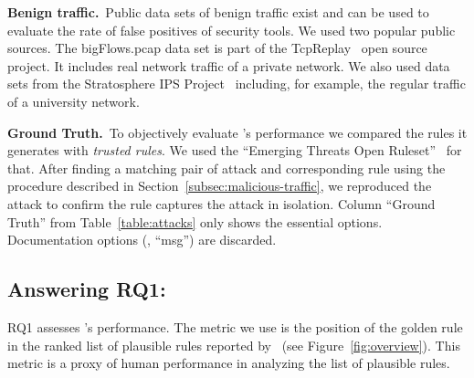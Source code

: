 \documentclass[conference]{IEEEtran}
\begin{document}
\noindent\textbf{Benign traffic.}~Public data sets of benign traffic
exist and can be used to evaluate the rate of false positives of
security tools. We used two popular public sources. The bigFlows.pcap
data set is part of the TcpReplay~\cite{tcpreplay} open source
project. It includes real network traffic of a private network. We
also used data sets from the Stratosphere IPS
Project~\cite{stratosphere-normal} including, for example, the regular
traffic of a university network.

\noindent\textbf{Ground Truth.}~To objectively evaluate \tname{}'s
performance we compared the rules it generates with \emph{trusted
  rules}. We used the ``Emerging Threats Open
Ruleset''~\cite{emerging-threats-open} for that. After finding a
matching pair of attack and corresponding rule using the procedure
described in Section~\ref{subsec:malicious-traffic}, we reproduced the
attack to confirm the rule captures the attack in isolation. Column
``Ground Truth'' from Table~\ref{table:attacks} only shows the
essential options. Documentation options (\eg{}, ``msg'') are
discarded.


\subsection{Answering RQ1: \textRQone}
\label{sec:answer-rqone}

RQ1 assesses \tname's performance. The metric we use is the position
of the golden rule in the ranked list of plausible rules reported by
\tname\ (see Figure~\ref{fig:overview}). This metric is a proxy of
human performance in analyzing the list of plausible rules.
\end{document}

